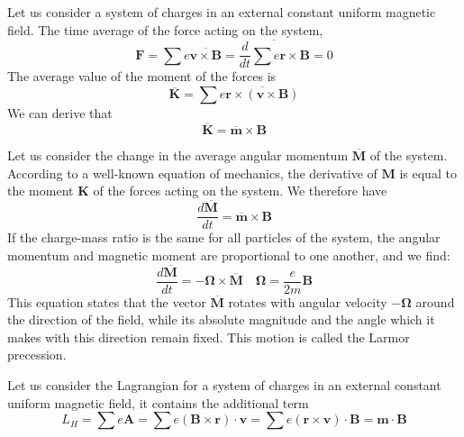 \documentclass[cyan]{elegantnote}
\begin{document}
Let us consider a system of charges in an external constant uniform magnetic field. The time average of the force acting on the system, 
\[\bm{F} = \sum e \overline{\bm{v} \times \bm{B}} = \overline{\frac{d}{dt} \sum e \bm{r} \times \bm{B}} = 0\]
The average value of the moment of the forces is 
\[\overline{\bm{K}} = \sum e \overline{\bm{r} \times (\bm{v} \times \bm{B})}\]
We can derive that
\[\overline{\bm{K}} = \overline{\bm{m}} \times \bm{B}\]

Let us consider the change in the average angular momentum $\overline{\bm{M}}$ of the system. According to a well-known equation of mechanics, the derivative of $\bm{M}$ is equal to the moment $\bm{K}$ of the forces acting on the system. We therefore have
\[\frac{d \overline{\bm{M}}}{dt} = \overline{\bm{m}} \times \bm{B}\]
If the charge-mass ratio is the same for all particles of the system, the angular momentum and magnetic moment are proportional to one another, and we find:
\[\frac{d \overline{\bm{M}}}{dt} = - \bm{\Omega} \times \overline{\bm{M}} \quad \bm{\Omega} = \frac{e}{2m} \bm{B}\]
This equation states that the vector $\overline{\bm{M}}$ rotates with angular velocity $-\bm{\Omega}$ around the direction of the field, while its absolute magnitude and the angle which it makes with this direction remain fixed. This motion is called the Larmor precession.

Let us consider the Lagrangian for a system of charges in an external constant uniform magnetic field, it contains the additional term
\[L_H = \sum e \bm{A} = \sum e (\bm{B} \times \bm{r}) \cdot \bm{v} = \sum e (\bm{r} \times \bm{v}) \cdot \bm{B} = \bm{m} \cdot \bm{B}\]
\end{document}
